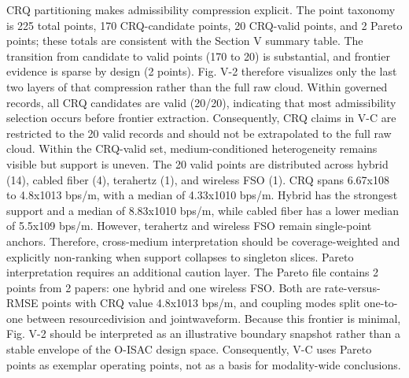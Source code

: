 {}CRQ partitioning makes admissibility compression explicit. The point taxonomy is 225 total points, 170 CRQ-candidate points, 20 CRQ-valid points, and 2 Pareto points; these totals are consistent with the Section V summary table. The transition from candidate to valid points (170 to 20) is substantial, and frontier evidence is sparse by design (2 points). Fig. V-2 therefore visualizes only the last two layers of that compression rather than the full raw cloud. Within governed records, all CRQ candidates are valid (20/20), indicating that most admissibility selection occurs before frontier extraction. Consequently, CRQ claims in V-C are restricted to the 20 valid records and should not be extrapolated to the full raw cloud.\markdownRendererParagraphSeparator
{}Within the CRQ-valid set, medium-conditioned heterogeneity remains visible but support is uneven. The 20 valid points are distributed across hybrid (14), cabled fiber (4), terahertz (1), and wireless FSO (1). CRQ spans 6.67x10\markdownRendererCircumflex{}8 to 4.8x10\markdownRendererCircumflex{}13 bps/m, with a median of 4.33x10\markdownRendererCircumflex{}10 bps/m. Hybrid has the strongest support and a median of 8.83x10\markdownRendererCircumflex{}10 bps/m, while cabled fiber has a lower median of 5.5x10\markdownRendererCircumflex{}9 bps/m. However, terahertz and wireless FSO remain single-point anchors. Therefore, cross-medium interpretation should be coverage-weighted and explicitly non-ranking when support collapses to singleton slices.\markdownRendererParagraphSeparator
{}Pareto interpretation requires an additional caution layer. The Pareto file contains 2 points from 2 papers: one hybrid and one wireless FSO. Both are rate-versus-RMSE points with CRQ value 4.8x10\markdownRendererCircumflex{}13 bps/m, and coupling modes split one-to-one between resource\markdownRendererUnderscore{}division and joint\markdownRendererUnderscore{}waveform. Because this frontier is minimal, Fig. V-2 should be interpreted as an illustrative boundary snapshot rather than a stable envelope of the O-ISAC design space. Consequently, V-C uses Pareto points as exemplar operating points, not as a basis for modality-wide conclusions.\markdownRendererParagraphSeparator
{}\markdownRendererParagraphSeparator
